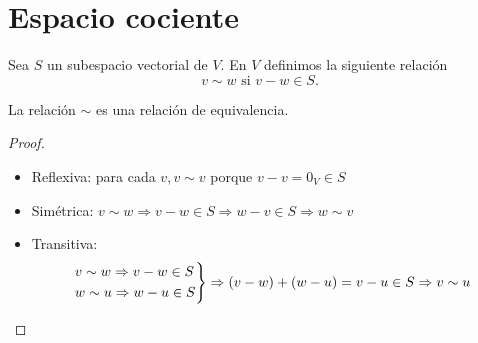 \section{Espacio cociente}
\begin{definition}
	Sea \(S \) un subespacio vectorial de \(V \). En \(V \) definimos la siguiente relación
	\[
		v \sim w \text{ si } v - w \in S.
	\]
\end{definition}
\begin{proposition}
	La relación \(\sim \) es una relación de equivalencia.
\end{proposition}
\begin{proof}
	\begin{itemize}
		\item Reflexiva: para cada \(v, v \sim v \) porque \(v - v = 0_V \in S \)
		\item Simétrica: \(v \sim w \Rightarrow v - w \in S \Rightarrow w - v \in S \Rightarrow w \sim v\)
		\item Transitiva:
		      \[
			      \begin{rcases}
				      v \sim w \Rightarrow v - w \in S \\
				      w \sim u \Rightarrow w - u \in S
			      \end{rcases} \Rightarrow (v - w) + (w - u) = v-  u \in S \Rightarrow v \sim u
		      \]
	\end{itemize}
\end{proof}


